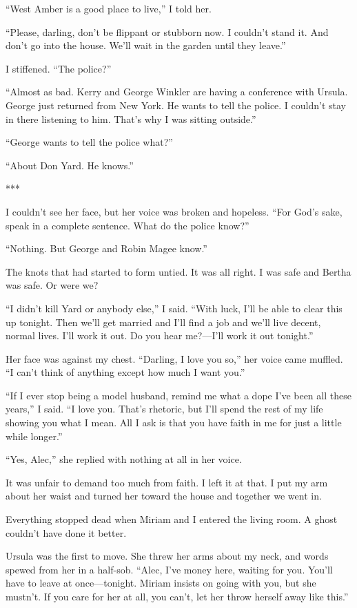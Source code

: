 \documentclass{novel}
\begin{document}
{“West Amber is a good place to live,” I told her.

“Please, darling, don’t be flippant or stubborn now. I couldn’t stand it. And don’t go into the house. We’ll wait in the garden until they leave.”

I stiffened. “The police?”

“Almost as bad. Kerry and George Winkler are having a conference with Ursula. George just returned from New York. He wants to tell the police. I couldn’t stay in there listening to him. That’s why I was sitting outside.”

“George wants to tell the police what?”

“About Don Yard. He knows.”

***

I couldn’t see her face, but her voice was broken and hopeless. “For God’s sake, speak in a complete sentence. What do the police know?”

“Nothing. But George and Robin Magee know.”

The knots that had started to form untied. It was all right. I was safe and Bertha was safe. Or were we?

“I didn’t kill Yard or anybody else,” I said. “With luck, I’ll be able to clear this up tonight. Then we’ll get married and I’ll find a job and we’ll live decent, normal lives. I’ll work it out. Do you hear me?—I’ll work it out tonight.”

Her face was against my chest. “Darling, I love you so,” her voice came muffled. “I can’t think of anything except how much I want you.”

“If I ever stop being a model husband, remind me what a dope I’ve been all these years,” I said. “I love you. That’s rhetoric, but I’ll spend the rest of my life showing you what I mean. All I ask is that you have faith in me for just a little while longer.”

“Yes, Alec,” she replied with nothing at all in her voice.

It was unfair to demand too much from faith. I left it at that. I put my arm about her waist and turned her toward the house and together we went in.

Everything stopped dead when Miriam and I entered the living room. A ghost couldn’t have done it better.

Ursula was the first to move. She threw her arms about my neck, and words spewed from her in a half-sob. “Alec, I’ve money here, waiting for you. You’ll have to leave at once—tonight. Miriam insists on going with you, but she mustn’t. If you care for her at all, you can’t, let her throw herself away like this.”

}
\end{document}
